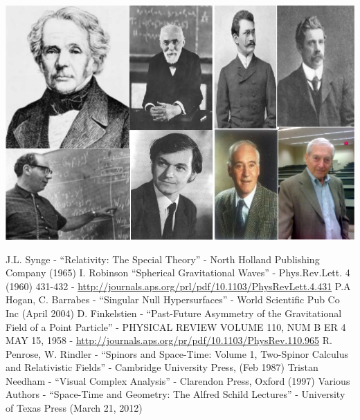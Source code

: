 \documentclass[floatfix,aps,prd,amsmath,amssymb]{revtex4}
\begin{document}
\includegraphics[scale=0.8]{figs/Cover.jpg}

\newpage

\tableofcontents

\newpage









 








\begin{thebibliography}{10}
J.L. Synge - ``Relativity: The Special Theory'' - North Holland Publishing Company (1965)
I. Robinson ``Spherical Gravitational Waves'' - Phys.Rev.Lett. 4 (1960) 431-432 - \url{http://journals.aps.org/prl/pdf/10.1103/PhysRevLett.4.431}
P.A Hogan, C. Barrabes - ``Singular Null Hypersurfaces'' - World Scientific Pub Co Inc (April 2004)
D. Finkelstien - ``Past-Future Asymmetry of the Gravitational Field of a Point Particle'' - PHYSICAL REVIEW VOLUME 110, NUM B ER 4 MAY 15, 1958 - \url{http://journals.aps.org/pr/pdf/10.1103/PhysRev.110.965}
R. Penrose, W. Rindler - ``Spinors and Space-Time: Volume 1, Two-Spinor Calculus and Relativistic Fields'' - Cambridge University Press, (Feb 1987)
Tristan Needham - ``Visual Complex Analysis'' - Clarendon Press, Oxford (1997)
Various Authors - ``Space-Time and Geometry: The Alfred Schild Lectures'' - University of Texas Press (March 21, 2012)
\end{thebibliography}
\end{document}
